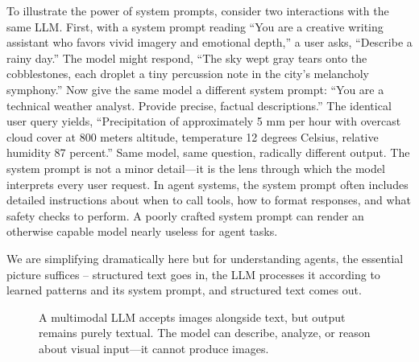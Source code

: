 To illustrate the power of system prompts, consider two interactions with the same LLM. First, with a system prompt reading ``You are a creative writing assistant who favors vivid imagery and emotional depth,'' a user asks, ``Describe a rainy day.'' The model might respond, ``The sky wept gray tears onto the cobblestones, each droplet a tiny percussion note in the city's melancholy symphony.'' Now give the same model a different system prompt: ``You are a technical weather analyst. Provide precise, factual descriptions.'' The identical user query yields, ``Precipitation of approximately 5 mm per hour with overcast cloud cover at 800 meters altitude, temperature 12 degrees Celsius, relative humidity 87 percent.'' Same model, same question, radically different output. The system prompt is not a minor detail---it is the lens through which the model interprets every user request. In agent systems, the system prompt often includes detailed instructions about when to call tools, how to format responses, and what safety checks to perform. A poorly crafted system prompt can render an otherwise capable model nearly useless for agent tasks.

We are simplifying dramatically here but for understanding agents, the essential picture suffices -- structured text goes in, the LLM processes it according to learned patterns and its system prompt, and structured text comes out.

\begin{figure}[t]
\centering
{}
\caption{A multimodal LLM accepts images alongside text, but output remains purely textual. The model can describe, analyze, or reason about visual input---it cannot produce images.}
\label{fig:llm_multimodal}
\end{figure}

